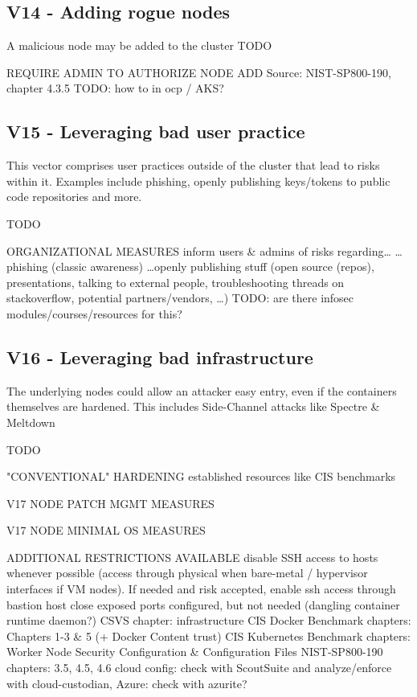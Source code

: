 \subsection{V14 - Adding rogue nodes}
A malicious node may be added to the cluster
TODO

REQUIRE ADMIN TO AUTHORIZE NODE ADD
	Source: NIST-SP800-190, chapter 4.3.5      TODO: how to in ocp / AKS?


\subsection{V15 - Leveraging bad user practice}
This vector comprises user practices outside of the cluster that lead to risks within it. Examples include phishing, openly publishing keys/tokens to public code repositories and more.

TODO

ORGANIZATIONAL MEASURES
	inform users \& admins of risks regarding…	
		…phishing (classic awareness)
		…openly publishing stuff (open source (repos), presentations, talking to external people, troubleshooting threads on stackoverflow, potential partners/vendors, …) TODO: are there infosec modules/courses/resources for this?



\subsection{V16 - Leveraging bad infrastructure}
The underlying nodes could allow an attacker easy entry, even if the containers themselves are hardened. This includes Side-Channel attacks like Spectre \& Meltdown

TODO

"CONVENTIONAL" HARDENING
	established resources like CIS benchmarks

V17 NODE PATCH MGMT MEASURES

V17 NODE MINIMAL OS MEASURES
	
ADDITIONAL RESTRICTIONS AVAILABLE
	disable SSH access to hosts whenever possible (access through physical when bare-metal / hypervisor interfaces if VM nodes). If needed and risk accepted, enable ssh access through bastion host
	close exposed ports configured, but not needed (dangling container runtime daemon?)
	CSVS chapter: infrastructure
	CIS Docker Benchmark chapters: Chapters 1-3 \& 5 (+ Docker Content trust)
	CIS Kubernetes Benchmark chapters: Worker Node Security Configuration \& Configuration Files
	NIST-SP800-190 chapters: 3.5, 4.5, 4.6
	cloud config: check with ScoutSuite and analyze/enforce with cloud-custodian, Azure: check with azurite?


